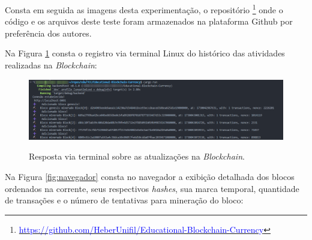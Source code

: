 \documentclass[article,12pt,oneside,a4paper,english,brazil]{unifil}
\begin{document}
\begin{Spacing}{1.5}
\begin{itemize}
\end{itemize}


Consta em seguida as imagens desta experimentação, o repositório \footnote{\href{https://github.com/HeberUnifil/Educational-Blockchain-Currency}{\textcolor{blue}{https://github.com/HeberUnifil/Educational-Blockchain-Currency}}} onde o código e os arquivos deste teste foram armazenados na plataforma Github por preferência dos autores.

Na Figura \ref*{fig:terminal} consta o registro via terminal Linux do histórico das atividades realizadas na \textit{Blockchain}:

\begin{figure} [H]
	\centering
	\captionsetup{justification=centering}
	\caption{Resposta via terminal sobre as atualizações na \textit{Blockchain}.}
	\includegraphics[width=1\linewidth]{../images/terminal-blockchain.png}
	\label{fig:terminal}

\end{figure}

Na Figura \ref*{fig:navegador} consta no navegador a exibição detalhada dos blocos ordenados na corrente, seus respectivos \textit{hashes}, sua marca temporal, quantidade de transações e o número de tentativas para mineração do bloco:


\end{Spacing}
\end{document}
